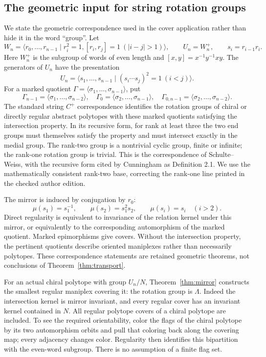 \subsection{The geometric input for string rotation groups}
We state the geometric correspondence used in the cover application rather than hide it in the word ``group''. Let
\[
 W_n=\langle r_0,\ldots,r_{n-1}\mid r_i^2=1,
       [r_i,r_j]=1\ (|i-j|>1)\rangle,
 \qquad U_n=W_n^+,
 \qquad s_i=r_{i-1}r_i.
\]
Here $W_n^+$ is the subgroup of words of even length and $[x,y]=x^{-1}y^{-1}xy$. The generators of $U_n$ have the presentation
\[
 U_n=\langle s_1,\ldots,s_{n-1}\mid(s_i\cdots s_j)^2=1
                                      \ (i<j)\rangle.
\]
For a marked quotient $\Gamma=\langle\sigma_1,\ldots,\sigma_{n-1}\rangle$, put
\[
 \Gamma_{n-1}=\langle\sigma_1,\ldots,\sigma_{n-2}\rangle,
 \quad\Gamma_0=\langle\sigma_2,\ldots,\sigma_{n-1}\rangle,
 \quad\Gamma_{0,n-1}=\langle\sigma_2,\ldots,\sigma_{n-2}\rangle.
\]
The standard string $C^+$ correspondence identifies the rotation groups of chiral or directly regular abstract polytopes with these marked quotients satisfying the intersection property. In its recursive form, for rank at least three the two end groups must themselves satisfy the property and must intersect exactly in the medial group. The rank-two group is a nontrivial cyclic group, finite or infinite; the rank-one rotation group is trivial. This is the correspondence of Schulte--Weiss, with the recursive form cited by Cunningham as Definition 2.1. We use the mathematically consistent rank-two base, correcting the rank-one line printed in the checked author edition.

The mirror is induced by conjugation by $r_0$:
\begin{equation}\label{eq:mirrorrotation}
 \mu(s_1)=s_1^{-1},\qquad \mu(s_2)=s_1^2s_2,
 \qquad\mu(s_i)=s_i\quad(i>2).
\end{equation}
Direct regularity is equivalent to invariance of the relation kernel under this mirror, or equivalently to the corresponding automorphism of the marked quotient. Marked epimorphisms give covers. Without the intersection property, the pertinent quotients describe oriented maniplexes rather than necessarily polytopes. These correspondence statements are retained geometric theorems, not conclusions of Theorem~\ref{thm:transport}.

For an actual chiral polytope with group $U_n/N$, Theorem~\ref{thm:mirror} constructs the smallest regular maniplex covering it: the rotation group is $\Lambda$. Indeed the intersection kernel is mirror invariant, and every regular cover has an invariant kernel contained in $N$. All regular polytope covers of a chiral polytope are included. To see the required orientability, color the flags of the chiral polytope by its two automorphism orbits and pull that coloring back along the covering map; every adjacency changes color. Regularity then identifies this bipartition with the even-word subgroup. There is no assumption of a finite flag set.

